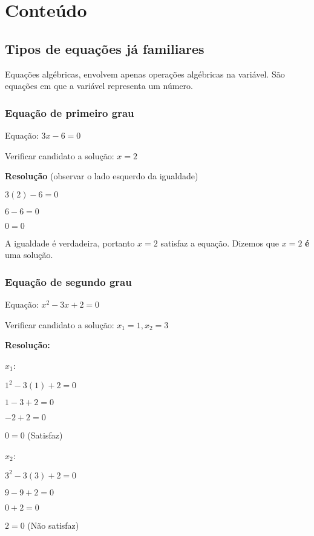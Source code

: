 \documentclass[a4paper]{article}
\begin{document}

\section{Conteúdo}

\subsection{Tipos de equações já familiares}

Equações algébricas, envolvem apenas operações algébricas na
variável. São equações em que a variável representa um número.

\subsubsection{Equação de primeiro grau}

Equação: $3x -6 = 0$

Verificar candidato a solução: $x=2$

{\bf Resolução} (observar o lado esquerdo da igualdade)

$3(2) - 6 =0$

$ 6-6 =0$

$0 = 0$

A igualdade é verdadeira, portanto $x=2$ satisfaz a equação. Dizemos
que $x=2$ {\bf é} uma solução.

\newpage
\subsubsection{Equação de segundo grau}

Equação: $x^2 - 3x + 2 = 0$

Verificar candidato a solução: $x_1 = 1, x_2 = 3$

{\bf Resolução:}
\begin{multicols}{2}
$x_1$:

$1^2 -3(1) + 2 = 0$

$1 - 3 + 2 = 0$

$-2 + 2 = 0$

$0=0$ (Satisfaz)

\columnbreak

$x_2$:

$3^2 -3(3) +2 = 0$

$9-9+2 = 0 $

$0 + 2 = 0$

$2=0$ (Não satisfaz)

\end{multicols}
\end{document}
